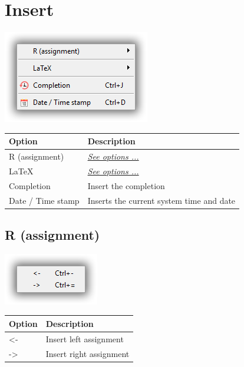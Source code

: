 
\hypertarget{menu_insert}{}
\section{Insert}

\includegraphics[scale=0.50]{./res/menu_insert.png}\\

\begin{scriptsize}
  \begin{tabularx}{\textwidth}{>{\hsize=0.3\hsize}X>{\hsize=0.7\hsize}X}\\
    \hline
    \textbf{Option} & \textbf{Description} \\
    \hline
    R (assignment) & \textit{\href{\#menu\_insert\_r}{See options ...}} \\
    \LaTeX & \textit{\href{\#menu\_insert\_latex}{See options ...}} \\
    Completion & Insert the completion \\
    Date / Time stamp & Inserts the current system time and date \\
    \hline
  \end{tabularx}
\end{scriptsize}


\hypertarget{menu_insert_r}{}
\subsection{R (assignment)}

\includegraphics[scale=0.50]{./res/menu_insert_r_assignment.png}\\

\begin{scriptsize}
  \begin{tabularx}{\textwidth}{>{\hsize=0.3\hsize}X>{\hsize=0.7\hsize}X}\\
    \hline
    \textbf{Option} & \textbf{Description} \\
    \hline
    <- & Insert left assignment \\
    -> & Insert right assignment \\
    \hline
  \end{tabularx}
\end{scriptsize}



